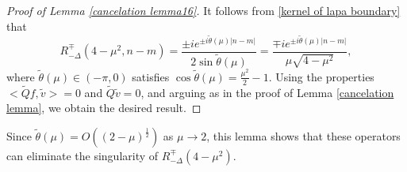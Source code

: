 \documentclass[reqno, 11pt]{amsart}
\numberwithin{equation}{section}
\begin{document}
\begin{proof}[Proof of Lemma \ref{cancelation lemma16}]
It follows from \eqref{kernel of lapa boundary} that
\begin{equation}\label{Laplace 4-mu2}
R^{\mp}_{-\Delta}(4-\mu^2,n-m)=\frac{\pm ie^{\pm i\tilde{\theta}(\mu)|n-m|}}{2\sin\tilde{\theta}(\mu)}=\frac{\mp ie^{\pm i\tilde{\theta}(\mu)|n-m|}}{\mu\sqrt{4-\mu^2}},
\end{equation}
where $\tilde{\theta}(\mu)\in(-\pi,0)$ satisfies $\cos\tilde{\theta}(\mu)=\frac{\mu^2}{2}-1$.
Using the properties $\big<\widetilde{Q}f,\tilde{v}\big>=0$ and $\widetilde{Q}\tilde{v}=0$, and arguing as in the proof of Lemma \ref{cancelation lemma}, we obtain the desired result.
\end{proof}
Since $\tilde{\theta}(\mu)=O((2-\mu)^{\frac{1}{2}})$ as $\mu\rightarrow2$, this lemma shows that these operators can eliminate the singularity of $R^{\mp}_{-\Delta}(4-\mu^2)$.
\end{document}
